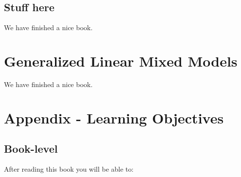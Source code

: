 \documentclass[]{book}
\begin{document}
\section{Stuff here}\label{stuff-here}

We have finished a nice book.

\chapter{Generalized Linear Mixed Models}\label{glmm}

We have finished a nice book.

\chapter{Appendix - Learning Objectives}\label{learningobj}

\section{Book-level}\label{book-level}

After reading this book you will be able to:
\end{document}

